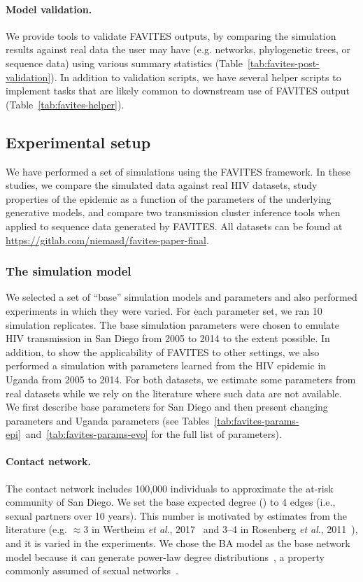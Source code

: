 \paragraph{Model validation.} We provide tools to validate FAVITES outputs, by comparing the simulation results against real data the user may have (e.g. networks, phylogenetic trees, or sequence data) using various summary statistics (Table~\ref{tab:favites-post-validation}). In addition to validation scripts, we have several helper scripts to implement tasks that are likely common to downstream use of FAVITES output (Table~\ref{tab:favites-helper}).

\subsection{Experimental setup}
We have performed a set of simulations using the FAVITES framework. In these studies,  we compare the simulated data against real \gls{HIV} datasets, study properties of the epidemic as a function of the parameters of the underlying generative models, and compare two transmission cluster inference tools when applied to sequence data generated by FAVITES. All datasets can be found at \url{https://gitlab.com/niemasd/favites-paper-final}.

\subsubsection{The simulation model}\label{sec:favites-default-params}
We selected a set of ``base'' simulation models and parameters and also performed experiments in which they were varied. For each parameter set, we ran 10 simulation replicates. The base simulation parameters were chosen to emulate \gls{HIV} transmission in San Diego from 2005 to 2014 to the extent possible. In addition, to show the applicability of FAVITES to other settings, we also performed a simulation with parameters learned from the \gls{HIV} epidemic in Uganda from 2005 to 2014. For both datasets, we estimate some parameters from real datasets while we rely on the literature where such data are not available.  We first describe base parameters for San Diego and then present changing parameters and Uganda parameters (see Tables~\ref{tab:favites-params-epi}~and~\ref{tab:favites-params-evo} for the full list of parameters).

\paragraph{Contact network.} The contact network includes 100,000 individuals  to approximate the at-risk community of San Diego. We set the base expected degree (\ED) to 4 edges (i.e., sexual partners over 10 years). This number is motivated by estimates from the literature (e.g. $\approx$3 in Wertheim \textit{et al}., 2017~\cite{Wertheim2017} and 3--4 in Rosenberg \textit{et al}., 2011~\cite{Rosenberg2011}), and it is varied in the experiments. We chose the \gls{BA} model as the base network model because it can generate power-law degree distributions~\cite{Barabasi1999}, a property commonly assumed of sexual networks~\cite{Hamilton2008}.

